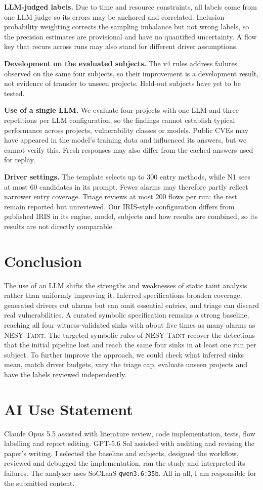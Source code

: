 \documentclass[sigconf]{acmart}
\newcommand{\tool}{\textsc{NESY-Taint}}
\begin{document}
\textbf{LLM-judged labels.} Due to time and resource constraints, all \NumLabelled{} labels come from one LLM judge so its errors may be anchored and correlated. Inclusion-probability weighting corrects the sampling imbalance but not wrong labels, so the precision estimates are provisional and have no quantified uncertainty. A flow key that recurs across runs may also stand for different driver assumptions.

\textbf{Development on the evaluated subjects.} The v4 rules address failures observed on the same four subjects, so their improvement is a development result, not evidence of transfer to unseen projects. Held-out subjects have yet to be tested.

\textbf{Use of a single LLM.} We evaluate four projects with one LLM and three repetitions per LLM configuration, so the findings cannot establish typical performance across projects, vulnerability classes or models. Public CVEs may have appeared in the model's training data and influenced its answers, but we cannot verify this. Fresh responses may also differ from the cached answers used for replay.

\textbf{Driver settings.} The template selects up to 300 entry methods, while N1 sees at most 60 candidates in its prompt. Fewer alarms may therefore partly reflect narrower entry coverage. Triage reviews at most 200 flows per run; the rest remain reported but unreviewed. Our IRIS-style configuration differs from published IRIS in its engine, model, subjects and how results are combined, so its results are not directly comparable.

\section{Conclusion}
The use of an LLM shifts the strengths and weaknesses of static taint analysis rather than uniformly improving it. Inferred specifications broaden coverage, generated drivers cut alarms but can omit essential entries, and triage can discard real vulnerabilities. A curated symbolic specification remains a strong baseline, reaching all four witness-validated sinks with about five times as many alarms as \tool{}. The targeted symbolic rules of \tool{} recover the detections that the initial pipeline lost and reach the same four sinks in at least one run per subject. To further improve the approach, we could check what inferred sinks mean, match driver budgets, vary the triage cap, evaluate unseen projects and have the labels reviewed independently.

\section*{AI Use Statement}
Claude Opus 5.5 assisted with literature review, code implementation, tests, flow labelling and report editing. GPT-5.6 Sol assisted with auditing and revising the paper's writing. I selected the baseline and subjects, designed the workflow, reviewed and debugged the implementation, ran the study and interpreted its failures. The analyzer uses SoCLaaS \texttt{qwen3.6:35b}. All in all, I am responsible for the submitted content.

\clearpage


\end{document}
